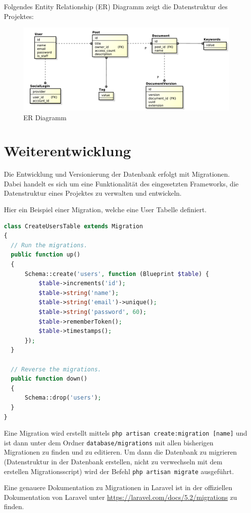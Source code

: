 Folgendes Entity Relationship (ER) Diagramm zeigt die Datenstruktur des Projektes:
\begin{figure}[H]
	\begin{center}
		\includegraphics[width=\linewidth]{../Datenstruktur.pdf}
		\caption{ER Diagramm}
	\end{center}
\end{figure}

\section{Weiterentwicklung}
Die Entwicklung und Versionierung der Datenbank erfolgt mit Migrationen.
Dabei handelt es sich um eine Funktionalit\"at des eingesetzten Frameworks, die Datenstruktur eines Projektes zu verwalten und entwickeln.

Hier ein Beispiel einer Migration, welche eine User Tabelle definiert.
\begin{lstlisting}[language={PHP}, caption=Beispiel eine Migration]
class CreateUsersTable extends Migration
{
  // Run the migrations.
  public function up()
  {
      Schema::create('users', function (Blueprint $table) {
          $table->increments('id');
          $table->string('name');
          $table->string('email')->unique();
          $table->string('password', 60);
          $table->rememberToken();
          $table->timestamps();
      });
  }

  // Reverse the migrations.
  public function down()
  {
      Schema::drop('users');
  }
}
\end{lstlisting}

Eine Migration wird erstellt mittels \texttt{php artisan create:migration [name]} und ist dann unter dem Ordner \texttt{database/migrations} mit allen bisherigen Migrationen zu finden und zu editieren.
Um dann die Datenbank zu migrieren (Datenstruktur in der Datenbank erstellen, nicht zu verwechseln mit dem erstellen Migrationsscript) wird der Befehl \texttt{php artisan migrate} ausgef\"uhrt.

Eine genauere Dokumentation zu Migrationen in Laravel ist in der offiziellen Dokumentation von Laravel unter \url{https://laravel.com/docs/5.2/migrations} zu finden.
